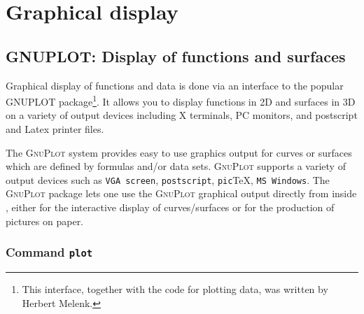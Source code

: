 \chapter{Graphical display}

\section{GNUPLOT: Display of functions and surfaces}

Graphical display of functions and data is done via an interface to the popular GNUPLOT package\footnote{This interface, together with the code for plotting data, was written by Herbert Melenk.}.
It allows you to display functions in 2D and surfaces in 3D
on a variety of output devices including X terminals, PC monitors, and
postscript and Latex printer files.

\newcommand{\Gnuplot}{\textsc{GnuPlot}}

The {\Gnuplot} system provides easy to use graphics output for curves or surfaces
which are defined by formulas and/or data sets.  {\Gnuplot} supports a variety of
output devices such as
\verb+VGA screen+, \verb+postscript+, \verb+pic+\TeX, \verb+MS Windows+.
The {\REDUCE} {\Gnuplot} package lets one use the {\Gnuplot} graphical output
directly from inside {\REDUCE}, either for the interactive display of
curves/surfaces or for the production of pictures on paper.

\subsection{Command \texttt{plot}}
\hypertarget{command:PLOT}{}

